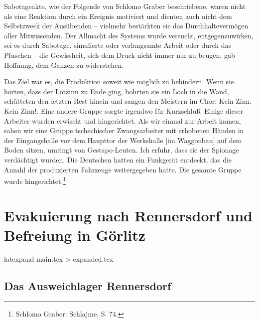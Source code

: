 \documentclass[a4paper,12pt,ngerman,
]{nisebook}
\begin{document}
Sabotageakte, wie der Folgende von Schlomo Graber beschriebene, waren nicht als eine Reaktion durch ein Ereignis motiviert und dienten auch nicht dem Selbstzweck der Ausübenden -- vielmehr bestärkten sie das Durchhaltevermögen aller Mitwissenden. Der Allmacht des Systems wurde versucht, entgegenzuwirken, sei es durch Sabotage, simulierte oder verlangsamte Arbeit oder durch das Pfuschen -- die Gewissheit, sich dem Druck nicht immer nur zu beugen, gab Hoffnung, dem Ganzen zu widerstehen.
\label{loetzinn}
\begin{leftbar}
Das Ziel war es, die Produktion soweit wie möglich zu behindern. Wenn sie hörten, dass der Lötzinn zu Ende ging, bohrten sie ein Loch in die Wand, schütteten den letzten Rest hinein und sangen den Meistern im Chor: \glqq Kein Zinn, Kein Zinn!\grqq. Eine andere Gruppe sorgte irgendwo für Kurzschluß. Einige dieser Arbeiter wurden erwischt und hingerichtet. Als wir einmal zur Arbeit kamen, sahen wir eine Gruppe tschechischer Zwangsarbeiter mit erhobenen Händen in der Eingangshalle vor dem Haupttor der Werkshalle [im Waggonbau] auf dem Boden sitzen, umringt von Gestapo-Leuten. Ich erfuhr, dass sie der Spionage verdächtigt wurden. Die Deutschen hatten ein Funkgerät entdeckt, das die Anzahl der produzierten Fahrzeuge weitergegeben hatte. Die gesamte Gruppe wurde hingerichtet.\footnote{Schlomo Graber: Schlajme, S. 74.}
\end{leftbar}
 
\chapter{Evakuierung nach Rennersdorf und Befreiung in Görlitz}
latexpand main.tex > expanded.tex
\section{Das Ausweichlager Rennersdorf}
\end{document}
